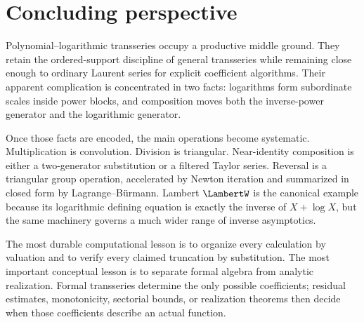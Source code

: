 \documentclass[11pt,oneside]{book}
\theoremstyle{definition}
\theoremstyle{remark}
\begin{document}
\backmatter

\chapter*{Concluding perspective}
Polynomial--logarithmic transseries occupy a productive middle ground.
They retain the ordered-support discipline of general transseries while
remaining close enough to ordinary Laurent series for explicit
coefficient algorithms. Their apparent complication is concentrated in
two facts: logarithms form subordinate scales inside power blocks, and
composition moves both the inverse-power generator and the logarithmic
generator.

Once those facts are encoded, the main operations become systematic.
Multiplication is convolution. Division is triangular. Near-identity
composition is either a two-generator substitution or a filtered Taylor
series. Reversal is a triangular group operation, accelerated by Newton
iteration and summarized in closed form by Lagrange--B\"urmann. Lambert
$\LambertW$ is the canonical example because its logarithmic defining equation is
exactly the inverse of $X+\log X$, but the same machinery governs a much
wider range of inverse asymptotics.

The most durable computational lesson is to organize every calculation by
valuation and to verify every claimed truncation by substitution. The most
important conceptual lesson is to separate formal algebra from analytic
realization. Formal transseries determine the only possible coefficients;
residual estimates, monotonicity, sectorial bounds, or realization theorems
then decide when those coefficients describe an actual function.
\end{document}
